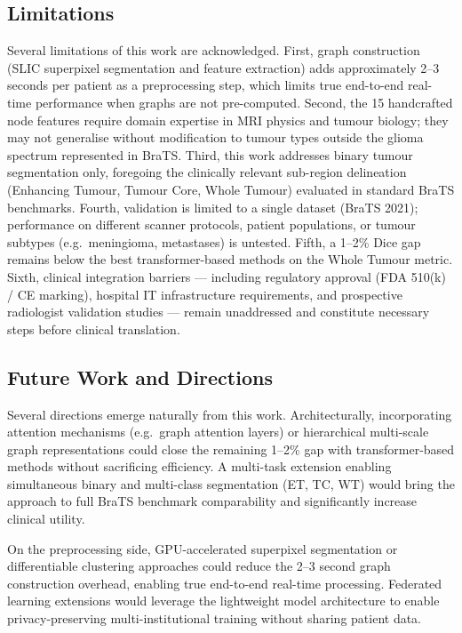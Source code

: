 \subsection{Limitations}

Several limitations of this work are acknowledged. First, graph construction (SLIC superpixel segmentation and feature extraction) adds approximately 2--3 seconds per patient as a preprocessing step, which limits true end-to-end real-time performance when graphs are not pre-computed. Second, the 15 handcrafted node features require domain expertise in MRI physics and tumour biology; they may not generalise without modification to tumour types outside the glioma spectrum represented in BraTS. Third, this work addresses binary tumour segmentation only, foregoing the clinically relevant sub-region delineation (Enhancing Tumour, Tumour Core, Whole Tumour) evaluated in standard BraTS benchmarks. Fourth, validation is limited to a single dataset (BraTS 2021); performance on different scanner protocols, patient populations, or tumour subtypes (e.g.\ meningioma, metastases) is untested. Fifth, a 1--2\% Dice gap remains below the best transformer-based methods on the Whole Tumour metric. Sixth, clinical integration barriers — including regulatory approval (FDA 510(k) / CE marking), hospital IT infrastructure requirements, and prospective radiologist validation studies — remain unaddressed and constitute necessary steps before clinical translation.


\subsection{Future Work and Directions}

Several directions emerge naturally from this work. Architecturally, incorporating attention mechanisms (e.g.\ graph attention layers) or hierarchical multi-scale graph representations could close the remaining 1--2\% gap with transformer-based methods without sacrificing efficiency. A multi-task extension enabling simultaneous binary and multi-class segmentation (ET, TC, WT) would bring the approach to full BraTS benchmark comparability and significantly increase clinical utility.

On the preprocessing side, GPU-accelerated superpixel segmentation or differentiable clustering approaches could reduce the 2--3 second graph construction overhead, enabling true end-to-end real-time processing. Federated learning extensions would leverage the lightweight model architecture to enable privacy-preserving multi-institutional training without sharing patient data.

